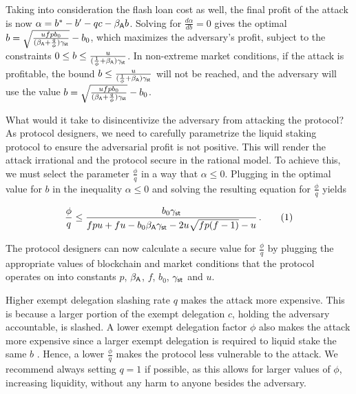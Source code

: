 Taking into consideration the flash loan cost as well, the final profit of the attack is now
$\alpha = b^* - b' - qc - \beta_{\textsf{A}} b$.
Solving for $\frac{d\alpha}{db} = 0$ gives the optimal $b = \sqrt{\frac{u f p b_0}{(\beta_{\textsf{A}} + \frac{q}{\phi})\gamma_{\textsf{st}}}} - b_0$,
which maximizes
the adversary's profit, subject to the constraints
$0 \leq b \leq \frac{u}{(\frac{1}{\phi} + \beta_{\textsf{A}}) \gamma_{\textsf{st}}}$.
In non-extreme market conditions, if the attack is profitable, the bound
$b \leq \frac{u}{(\frac{1}{\phi} + \beta_{\textsf{A}})\gamma_{\textsf{st}}}$ will not be reached,
and the adversary will use the value
$b = \sqrt{\frac{u f p b_0}{(\beta_{\textsf{A}} + \frac{q}{\phi})\gamma_{\textsf{st}}}} - b_0$.

What would it take to disincentivize the adversary from attacking the protocol?
As protocol designers, we need to carefully parametrize the liquid staking protocol
to ensure the adversarial profit is not positive. This will render the attack irrational
and the protocol secure in the rational model. To achieve this, we must select
the parameter $\frac{\phi}{q}$ in a way that $\alpha \leq 0$.
Plugging in the optimal value for $b$ in the inequality $\alpha \leq 0$ and solving
the resulting equation for $\frac{\phi}{q}$ yields

\begin{gather*}
  \frac{\phi}{q} \leq \frac{b_0 \gamma_{\textsf{st}}}{f p u + f u - b_0 \beta_{\textsf{A}} \gamma_{\textsf{st}} - 2 u \sqrt{fp (f-1)} - u}\,. \label{eq:phi-choice} \tag{$1$}
\end{gather*}

The protocol designers can now calculate a secure value for $\frac{\phi}{q}$
by plugging
the appropriate values of blockchain and market conditions
that the protocol operates on into
constants $p$, $\beta_{\textsf{A}}$, $f$, $b_0$, $\gamma_{\textsf{st}}$ and $u$.

Higher exempt delegation slashing rate $q$ makes the attack more expensive. This
is because a larger portion of the exempt delegation $c$, holding the adversary accountable,
is slashed. A lower exempt delegation factor $\phi$ also makes the attack more expensive
since a larger exempt delegation is required to liquid stake the same $b$ \asset.
Hence, a lower $\frac{\phi}{q}$ makes the protocol less vulnerable to the attack.
We recommend always setting $q = 1$ if possible, as this allows for
larger values of $\phi$, increasing liquidity, without any harm to anyone
besides the adversary.


